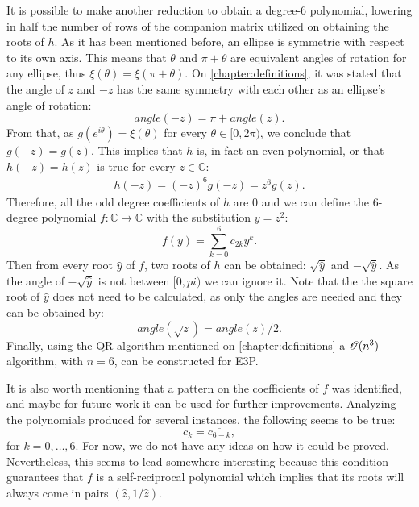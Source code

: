 It is possible to make another reduction to obtain a degree-$6$ polynomial, lowering in half the number of rows of the companion matrix utilized on obtaining the roots of $h$. 
As it has been mentioned before, an ellipse is symmetric with respect to its own axis. This means that $\theta$ and $\pi + \theta$ are equivalent angles of rotation for any ellipse, thus $\xi(\theta) = \xi(\pi + \theta)$.
On \autoref{chapter:definitions}, it was stated that the angle of $z$ and $-z$ has the same symmetry with each other as an ellipse's angle of rotation:
\begin{equation*}
angle(-z) = \pi + angle(z).
\end{equation*}
From that, as $g(e^{i\theta})=\xi(\theta)$ for every $\theta \in [0, 2\pi)$, we conclude that $g(-z)=g(z)$. This implies that $h$ is, in fact an even polynomial, or that $h(-z) = h(z)$ is true for every $z\in\mathbb{C}$:
\begin{align}
h(-z) = (-z)^6g(-z) = z^6g(z).
\end{align}
Therefore, all the odd degree coefficients of $h$ are $0$ and we can define the $6$-degree polynomial $f : \mathbb{C} \mapsto \mathbb{C}$ with the substitution $y=z^2$:
\begin{equation}
f(y) = \sum_{k=0}^{6} c_{2k} y^k.
\end{equation}
Then from every root $\hat{y}$ of $f$, two roots of $h$ can be obtained: $\sqrt{\hat{y}}$ and $-\sqrt{\hat{y}}$. As the angle of $-\sqrt{\hat{y}}$ is not between $[0, pi)$ we can ignore it. Note that the the square root of $\hat{y}$ does not need to be calculated, as only the angles are needed and they can be obtained by:
\begin{equation}
angle(\sqrt{z}) = angle(z)/2.
\end{equation}
Finally, using the QR algorithm mentioned on \autoref{chapter:definitions} a $\mathscr{O}(n^3)$ algorithm, with $n=6$, can be constructed for E3P.

It is also worth mentioning that a pattern on the coefficients of $f$ was identified, and maybe for future work it can be used for further improvements. Analyzing the polynomials produced for several instances, the following seems to be true:
\begin{equation}
c_k = \overline{c_{6-k}},
\end{equation}
for $k=0, \dots, 6$. For now, we do not have any ideas on how it could be proved. Nevertheless, this seems to lead somewhere interesting because this condition guarantees that $f$ is a self-reciprocal polynomial which implies that its roots will always come in pairs $(\hat{z}, 1/\hat{z})$.


